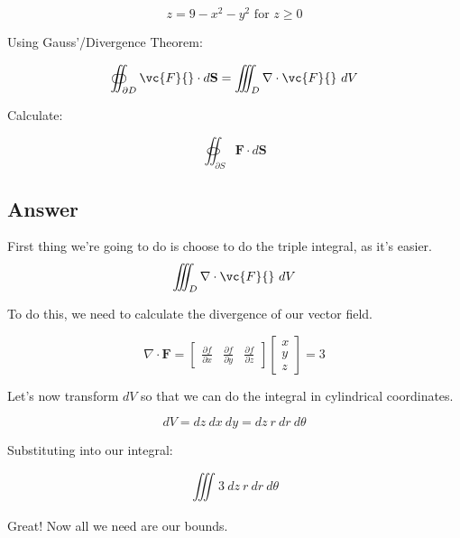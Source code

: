 \documentclass{article}
\begin{document}
\begin{equation}
  z = 9 - x^2 - y^2
  \text{ for } z \geq 0
\end{equation}

Using Gauss'/Divergence Theorem: 

\begin{equation}
  \oiint_{\partial D} \vc{F}{} \cdot d \mathbf{S}
  = \iiint_{D} \nabla \cdot \vc{F}{} \ dV
\end{equation}

Calculate:

\begin{equation}
  \oiint_{\partial S} \mathbf{F} \cdot d \mathbf{S} 
\end{equation}

\subsection{Answer}

First thing we're going to do is choose to do the triple integral, as it's 
easier. 
\begin{equation}
  \iiint_{D} \nabla \cdot \vc{F}{} \ dV
\end{equation}

To do this, we need to calculate the divergence of our vector field. 

\begin{equation}
  \nabla \cdot \mathbf{F} = 
  \begin{bmatrix} 
    \frac{\partial f}{\partial x} &
    \frac{\partial f}{\partial y} &
    \frac{\partial f}{\partial z} 
  \end{bmatrix}
\begin{bmatrix} 
  x \\ y \\ z
\end{bmatrix}
= 
3
\end{equation}

Let's now transform $dV$ so that we can do the integral in cylindrical coordinates.

\begin{equation}
  dV = dz \ dx \ dy 
  = dz \ r \ dr \ d \theta
\end{equation}

Substituting into our integral:

\begin{equation}
  \iiint_{} 3 \ dz \ r \ dr \ d \theta
\end{equation}

Great! Now all we need are our bounds. 
\end{document}
